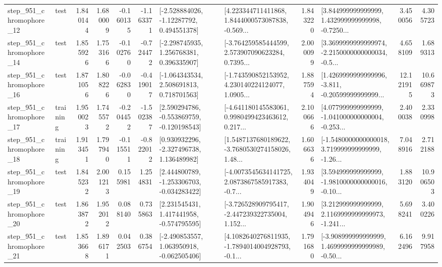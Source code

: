 \begin{tabular}{llrrrrllrlrr}
  step\_951\_chromophore\_12 &      test &      1.840144 &    1.680009 &     -0.160135 & -1.163371 &    [-2.528884026, -1.12287792, 0.494551378] &  [4.223344711411868, 1.8444000573087838, -0.569... &       1.843220 &  [3.844999999999999, 1.432999999999998, -0.7250... &            3.450056 &          4.305723 \\
  step\_951\_chromophore\_14 &      test &      1.855926 &    1.753166 &     -0.102760 & -0.724472 &    [-2.298745935, 1.256768381, 0.396335907] &  [-3.764259585444599, 2.573907090623284, 0.7395... &       2.000099 &  [3.3699999999999974, -2.2150000000000034, -0.5... &            4.658109 &          1.689313 \\
  step\_951\_chromophore\_16 &      test &      1.871056 &    1.808226 &     -0.062830 & -0.419017 &    [-1.064343534, 2.508691813, 0.718701563] &  [-1.743590852153952, 4.230140224124077, 1.0905... &       1.887594 &  [1.4269999999999996, -3.811, -0.20599999999999... &           12.121915 &         10.669873 \\
  step\_951\_chromophore\_17 &  training &      1.950023 &    1.745572 &     -0.204452 & -1.502387 &   [2.590294786, -0.553869759, -0.120198543] &  [-4.641180145583061, 0.9980499423463612, 0.217... &       2.100666 &  [4.077999999999999, -1.041000000000004, -0.253... &            2.400038 &          2.330998 \\
  step\_951\_chromophore\_18 &  training &      1.913451 &    1.797940 &     -0.115511 & -0.822012 &    [0.930932296, -2.327496738, 1.136489982] &  [1.5487137680189622, -3.7680530274158026, 1.48... &       1.606636 &  [-1.5480000000000018, 3.719999999999999, -1.26... &            7.048916 &          2.712188 \\
  step\_951\_chromophore\_19 &      test &      1.845232 &    2.001213 &      0.155981 &  1.254831 &   [2.444800789, -1.253306703, -0.034283422] &  [-4.0073545634141725, 2.0873867585917383, -0.7... &       1.934049 &  [3.594999999999999, -1.9810000000000016, -0.10... &            1.883120 &         10.906503 \\
  step\_951\_chromophore\_20 &      test &      1.863872 &    1.952012 &      0.088140 &  0.735863 &    [2.231545431, 1.417441958, -0.574795595] &  [-3.726528909795417, -2.447239322735004, 1.152... &       1.904946 &  [3.212999999999999, 2.1169999999999973, -1.241... &            5.698241 &          3.400226 \\
  step\_951\_chromophore\_21 &      test &      1.853668 &    1.896171 &      0.042503 &  0.386754 &   [-2.490853557, 1.063950918, -0.062505406] &  [4.1082640276811935, -1.7894014004928793, -0.1... &       1.791680 &  [-3.908999999999999, 1.4699999999999989, -0.50... &            6.162496 &          9.917958 \\

\end{tabular}
